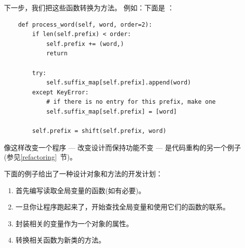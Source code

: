 
下一步，我们把这些函数转换为方法。
例如：下面是  ：

\begin{lstlisting}
    def process_word(self, word, order=2):
        if len(self.prefix) < order:
            self.prefix += (word,)
            return

        try:
            self.suffix_map[self.prefix].append(word)
        except KeyError:
            # if there is no entry for this prefix, make one
            self.suffix_map[self.prefix] = [word]

        self.prefix = shift(self.prefix, word)
\end{lstlisting}


像这样改变一个程序 --- 改变设计而保持功能不变 --- 是代码重构的另一个例子
(参见\ref{refactoring}~节)。



下面的例子给出了一种设计对象和方法的开发计划：

\begin{enumerate}


\item 首先编写读取全局变量的函数(如有必要)。

\item 一旦你让程序跑起来了，开始查找全局变量和使用它们的函数的联系。

\item 封装相关的变量作为一个对象的属性。

\item 转换相关函数为新类的方法。

\end{enumerate}

